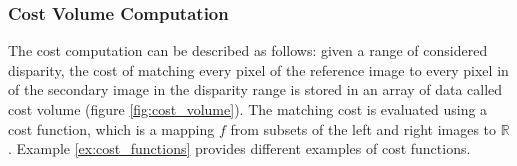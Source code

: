 \subsubsection{Cost Volume Computation}
The cost computation can be described as follows: given a range of considered disparity, the cost of matching every pixel of the reference image to every pixel in of the secondary image in the disparity range is stored in an array of data called cost volume (figure \ref{fig:cost_volume}). The matching cost is evaluated using a cost function, which is a mapping $f$ from subsets of the left and right images to $\mathbb{R}$. Example \ref{ex:cost_functions} provides different examples of cost functions.


